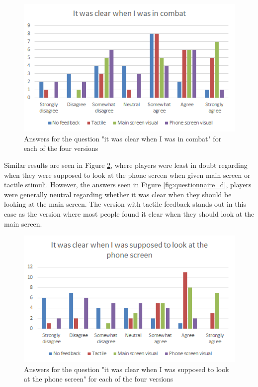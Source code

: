 \begin{figure}[h!]
	\centering
	\includegraphics[scale=1]{figures/questionnaire_b.png}
	\caption{Answers for the question "it was clear when I was in combat" for each of the four versions}\label{fig:questionnaire_b}
\end{figure}

Similar results are seen in Figure \ref{fig:questionnaire_c}, where players were least in doubt regarding when they were supposed to look at the phone screen when given main screen or tactile stimuli. However, the answers seen in Figure \ref{fig:questionnaire_d}, players were generally neutral regarding whether it was clear when they should be looking at the main screen. The version with tactile feedback stands out in this case as the version where most people found it clear when they should look at the main screen.

\begin{figure}[h!]
	\centering
	\includegraphics[scale=1]{figures/questionnaire_c.png}
	\caption{Answers for the question "it was clear when I was supposed to look at the phone screen" for each of the four versions}\label{fig:questionnaire_c}
\end{figure}

